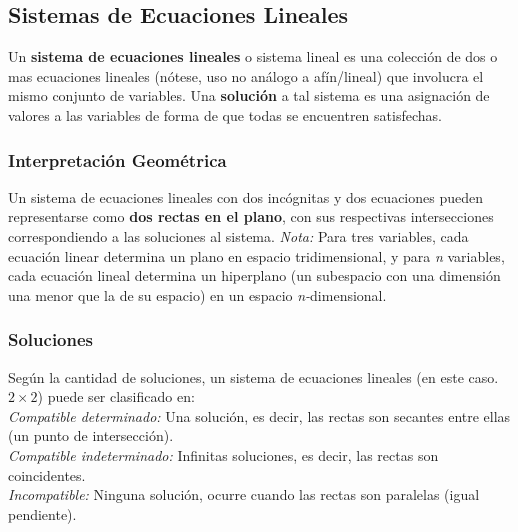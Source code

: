 \subsection{Sistemas de Ecuaciones Lineales}
Un \textbf{sistema de ecuaciones lineales} o sistema lineal es una colección de dos o mas ecuaciones lineales (nótese, uso no análogo a afín/lineal) que involucra el mismo conjunto de variables. Una \textbf{solución} a tal sistema es una asignación de valores a las variables de forma de que todas se encuentren satisfechas.\\


\subsubsection{Interpretación Geométrica}
Un sistema de ecuaciones lineales con dos incógnitas y dos ecuaciones pueden representarse como \textbf{dos rectas en el plano}, con sus respectivas intersecciones correspondiendo a las soluciones al sistema.
\textit{Nota:} Para tres variables, cada ecuación linear determina un plano en espacio tridimensional, y para \textit{n} variables, cada ecuación lineal determina un hiperplano (un subespacio con una dimensión una menor que la de su espacio) en un espacio \textit{n-}dimensional.
\subsubsection{Soluciones}
Según la cantidad de soluciones, un sistema de ecuaciones lineales (en este caso. $2\times2$) puede ser clasificado en:\\
\textit{Compatible determinado:} Una solución, es decir, las rectas son secantes entre ellas (un punto de intersección).\\
\textit{Compatible indeterminado:} Infinitas soluciones, es decir, las rectas son coincidentes.\\
\textit{Incompatible:} Ninguna solución, ocurre cuando las rectas son paralelas (igual pendiente).\\
